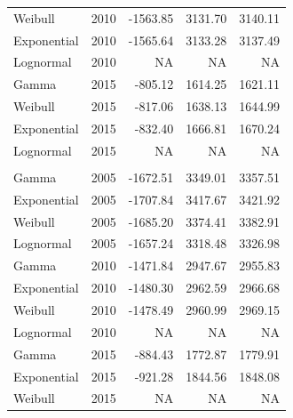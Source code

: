 \documentclass[
11pt, %
oneside, %
english, %
singlespacing, %
]{macthesis} %
\begin{document}
\begin{table}
\begin{tabular}[t]{llrrr}
\hspace{1em}Weibull & 2010 & -1563.85 & 3131.70 & 3140.11\\
\hspace{1em}Exponential & 2010 & -1565.64 & 3133.28 & 3137.49\\
\hspace{1em}Lognormal & 2010 & NA & NA & \vphantom{1} NA\\
\hspace{1em}Gamma & 2015 & -805.12 & 1614.25 & 1621.11\\
\hspace{1em}Weibull & 2015 & -817.06 & 1638.13 & 1644.99\\
\hspace{1em}Exponential & 2015 & -832.40 & 1666.81 & 1670.24\\
\hspace{1em}Lognormal & 2015 & NA & NA & \vphantom{2} NA\\
\addlinespace[0.3em]
\multicolumn{5}{l}{\textbf{Destination: Other's home}}\\
\hspace{1em}Gamma & 2005 & -1672.51 & 3349.01 & 3357.51\\
\hspace{1em}Exponential & 2005 & -1707.84 & 3417.67 & 3421.92\\
\hspace{1em}Weibull & 2005 & -1685.20 & 3374.41 & 3382.91\\
\hspace{1em}Lognormal & 2005 & -1657.24 & 3318.48 & 3326.98\\
\hspace{1em}Gamma & 2010 & -1471.84 & 2947.67 & 2955.83\\
\hspace{1em}Exponential & 2010 & -1480.30 & 2962.59 & 2966.68\\
\hspace{1em}Weibull & 2010 & -1478.49 & 2960.99 & 2969.15\\
\hspace{1em}Lognormal & 2010 & NA & NA & NA\\
\hspace{1em}Gamma & 2015 & -884.43 & 1772.87 & 1779.91\\
\hspace{1em}Exponential & 2015 & -921.28 & 1844.56 & 1848.08\\
\hspace{1em}Weibull & 2015 & NA & NA & NA\\

\end{tabular}
\end{table}
\end{document}
